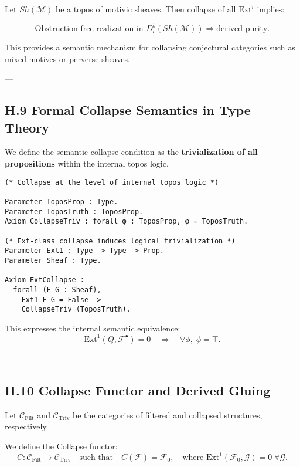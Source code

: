 \documentclass[11pt]{article}
\begin{document}
Let $Sh(\mathcal{M})$ be a topos of motivic sheaves.  
Then collapse of all $\mathrm{Ext}^i$ implies:

\[
\text{Obstruction-free realization in } D^b_c(Sh(\mathcal{M})) \Rightarrow \text{derived purity}.
\]

This provides a semantic mechanism for collapsing conjectural categories such as mixed motives or perverse sheaves.

---

\subsection*{H.9 Formal Collapse Semantics in Type Theory}

We define the semantic collapse condition as the \textbf{trivialization of all propositions} within the internal topos logic.

\begin{lstlisting}[language=Coq, caption=Topos-Level Collapse Trivialization]
(* Collapse at the level of internal topos logic *)

Parameter ToposProp : Type.
Parameter ToposTruth : ToposProp.
Axiom CollapseTriv : forall φ : ToposProp, φ = ToposTruth.

(* Ext-class collapse induces logical trivialization *)
Parameter Ext1 : Type -> Type -> Prop.
Parameter Sheaf : Type.

Axiom ExtCollapse :
  forall (F G : Sheaf),
    Ext1 F G = False ->
    CollapseTriv (ToposTruth).
\end{lstlisting}

This expresses the internal semantic equivalence:
\[
\mathrm{Ext}^1(Q, \mathcal{F}^\bullet) = 0 \quad \Rightarrow \quad \forall \phi, \; \phi = \top.
\]

---

\subsection*{H.10 Collapse Functor and Derived Gluing}

Let \( \mathcal{C}_\mathrm{Filt} \) and \( \mathcal{C}_\mathrm{Triv} \) be the categories of filtered and collapsed structures, respectively.

We define the Collapse functor:
\[
C : \mathcal{C}_\mathrm{Filt} \longrightarrow \mathcal{C}_\mathrm{Triv}
\quad \text{such that} \quad
C(\mathcal{F}) = \mathcal{F}_0, \quad \text{where } \mathrm{Ext}^1(\mathcal{F}_0, \mathcal{G}) = 0 \; \forall \mathcal{G}.
\]
\end{document}
